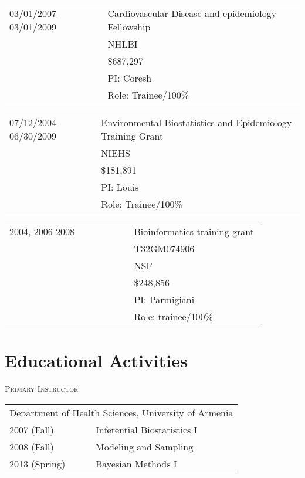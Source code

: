 \documentclass[11pt]{article}%
\begin{document}
\vspace{0.5em}


\begin{tabular}{ll}
03/01/2007-03/01/2009 & Cardiovascular Disease and epidemiology Fellowship\\
& NHLBI\\
& \$687,297\\
& PI: Coresh\\
& Role: Trainee/100\%
\end{tabular}

\vspace{0.5em}

\begin{tabular}{ll}
07/12/2004-06/30/2009 & Environmental Biostatistics and Epidemiology Training Grant \\
& NIEHS\\
& \$181,891\\
& PI: Louis\\
& Role: Trainee/100\%
\end{tabular}

\vspace{0.5em}

\begin{tabular}{ll}
2004, 2006-2008 ~~~~~~~~~~& Bioinformatics training grant \\
& T32GM074906\\
& NSF\\
& \$248,856\\
& PI: Parmigiani\\
& Role: trainee/100\%
\end{tabular}
\vspace{0.5em}

\section*{\sc Educational Activities}

\noindent\textsc{Primary Instructor}

\begin{tabular}{ll}
\multicolumn{2}{c}{Department of Health Sciences, University of
  Armenia}\\
2007 (Fall) & Inferential Biostatistics I \\
2008 (Fall) & Modeling and Sampling \\[3pt]
2013 (Spring) & Bayesian Methods I
\end{tabular}
\end{document}
